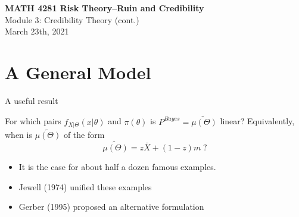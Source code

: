\documentclass[11pt]{beamer}
\begin{document}
\begin{frame}
  \frametitle{}
  \begin{center}
    \textbf{\large MATH 4281 Risk Theory--Ruin and Credibility}\\
    \vspace{1cm}
    {\large  Module 3: Credibility Theory (cont.)} \\
    \vspace{1cm}
    {\large  March 23th, 2021}
    \end{center}
    \vspace{1cm}
\end{frame}
\begin{frame}
\tableofcontents
\end{frame}
\section{A General Model}
\begin{frame}{A useful result}

For which pairs $f_{X|\Theta}(x|\theta)$ and $\pi(\theta)$ is $P^{Bayes}=\widetilde{\mu(\Theta)}$ linear? Equivalently, when is $\widetilde{\mu(\Theta)}$ of the form
$$\widetilde{\mu(\Theta)}=z \bar{X} + (1-z)m\;?$$
\begin{itemize}
\item It is the case for about half a dozen famous examples.
\item Jewell (1974) unified these examples
\item Gerber (1995) proposed an alternative formulation
\end{itemize}
\end{frame}
\end{document}
